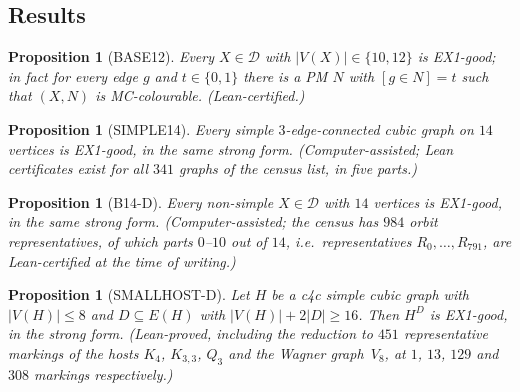 \documentclass[11pt]{amsart}
\newtheorem{proposition}[theorem]{Proposition}
\theoremstyle{definition}
\theoremstyle{remark}
\newcommand{\cD}{\mathcal{D}}
\newcommand{\Lean}{\textsf{Lean}}
\begin{document}
\subsection{Results}
\begin{proposition}[BASE12]\label{prop:base12}
Every $X\in\cD$ with $|V(X)|\in\{10,12\}$ is EX1-good; in fact for every edge $g$ and $t\in\{0,1\}$ there is a PM $N$ with $[g\in N]=t$ such that $(X,N)$ is MC-colourable. \textup{(\Lean-certified.)}
\end{proposition}

\begin{proposition}[SIMPLE14]\label{prop:s14}
Every simple $3$-edge-connected cubic graph on $14$ vertices is EX1-good, in the same strong form. \textup{(Computer-assisted; \Lean{} certificates exist for all $341$ graphs of the census list, in five parts.)}
\end{proposition}

\begin{proposition}[B14-D]\label{prop:b14d}
Every non-simple $X\in\cD$ with $14$ vertices is EX1-good, in the same strong form. \textup{(Computer-assisted; the census has $984$ orbit representatives, of which parts $0$--$10$ out of $14$, i.e.\ representatives $R_0,\dots,R_{791}$, are \Lean-certified at the time of writing.)}
\end{proposition}

\begin{proposition}[SMALLHOST-D]\label{prop:smallhost}
Let $H$ be a c4c simple cubic graph with $|V(H)|\le 8$ and $D\subseteq E(H)$ with $|V(H)|+2|D|\ge 16$. Then $H^D$ is EX1-good, in the strong form. \textup{(\Lean-proved, including the reduction to $451$ representative markings of the hosts $K_4$, $K_{3,3}$, $Q_3$ and the Wagner graph~$V_8$, at $1$, $13$, $129$ and $308$ markings respectively.)}
\end{proposition}
\end{document}
